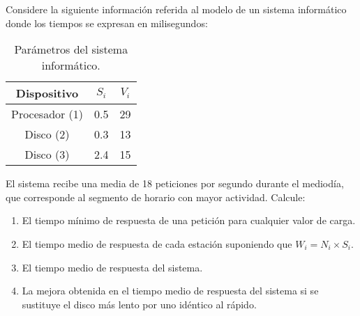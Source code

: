 \begin{ejercicio}\label{ej:5.14}
    Considere la siguiente información referida al modelo de un sistema informático donde los tiempos se expresan en milisegundos:
    \begin{table}[h]
        \centering
        \begin{tabular}{|c|c|c|}
            \hline
            Dispositivo & $S_i$ & $V_i$ \\
            \hline
            Procesador (1) & 0.5 & 29 \\
            Disco (2) & 0.3 & 13 \\
            Disco (3) & 2.4 & 15 \\
            \hline
        \end{tabular}
        \caption{Parámetros del sistema informático.}
        \label{tab:5.14}
    \end{table}
    El sistema recibe una media de 18 peticiones por segundo durante el mediodía, que corresponde al segmento de horario con mayor actividad. Calcule:
    \begin{enumerate}
        \item El tiempo mínimo de respuesta de una petición para cualquier valor de carga.
        \item El tiempo medio de respuesta de cada estación suponiendo que $W_i = N_i \times S_i$.
        \item El tiempo medio de respuesta del sistema.
        \item La mejora obtenida en el tiempo medio de respuesta del sistema si se sustituye el disco más lento por uno idéntico al rápido.
    \end{enumerate}
\end{ejercicio}
\begin{comment}
\solucion
    \begin{enumerate}
        \item El tiempo mínimo de respuesta absoluto es 54.4 ms.
        \item $R_1 = 0.68$, $R_2 = 0.32$, $R_3 = 6.82$ (expresado en ms).
        \item El tiempo medio de respuesta del sistema es $R_0 = 126.1$ ms.
        \item El tiempo medio de respuesta mejora 4.39 veces.
    \end{enumerate}
\end{comment}


